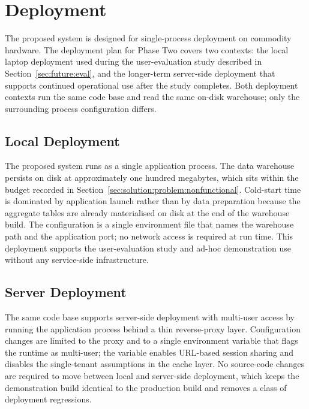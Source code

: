 \section{Deployment}
\label{sec:future:deployment}

The proposed system is designed for single-process deployment on commodity
hardware. The deployment plan for Phase Two covers two contexts: the local
laptop deployment used during the user-evaluation study described in
Section~\ref{sec:future:eval}, and the longer-term server-side deployment
that supports continued operational use after the study completes. Both
deployment contexts run the same code base and read the same on-disk
warehouse; only the surrounding process configuration differs.

\subsection{Local Deployment}
\label{sec:future:deployment:local}

The proposed system runs as a single application process. The data warehouse
persists on disk at approximately one hundred megabytes, which sits within
the budget recorded in Section~\ref{sec:solution:problem:nonfunctional}.
Cold-start time is dominated by application launch rather than by data
preparation because the aggregate tables are already materialised on disk
at the end of the warehouse build. The configuration is a single environment
file that names the warehouse path and the application port; no network
access is required at run time. This deployment supports the user-evaluation
study and ad-hoc demonstration use without any service-side infrastructure.

\subsection{Server Deployment}
\label{sec:future:deployment:server}

The same code base supports server-side deployment with multi-user access
by running the application process behind a thin reverse-proxy layer.
Configuration changes are limited to the proxy and to a single environment
variable that flags the runtime as multi-user; the variable enables
URL-based session sharing and disables the single-tenant assumptions in the
cache layer. No source-code changes are required to move between local and
server-side deployment, which keeps the demonstration build identical to the
production build and removes a class of deployment regressions.

